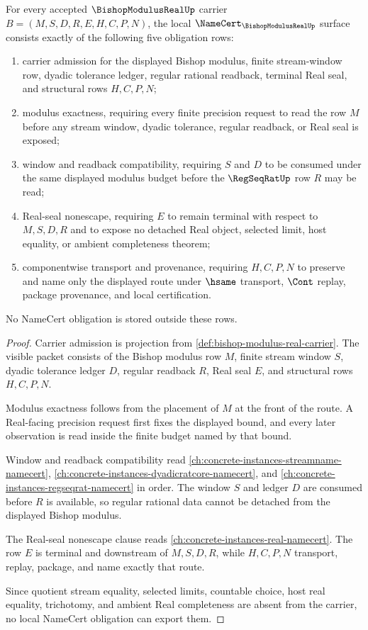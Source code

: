 \begin{theorem}
\label{thm:bishop-modulus-real-namecert-obligations}
For every accepted $\BishopModulusRealUp$ carrier $B=(M,S,D,R,E,H,C,P,N)$, the local $\NameCert_{\BishopModulusRealUp}$ surface consists exactly of the following five obligation rows:
\begin{enumerate}
\item carrier admission for the displayed Bishop modulus, finite stream-window row, dyadic tolerance ledger, regular rational readback, terminal Real seal, and structural rows $H,C,P,N$;
\item modulus exactness, requiring every finite precision request to read the row $M$ before any stream window, dyadic tolerance, regular readback, or Real seal is exposed;
\item window and readback compatibility, requiring $S$ and $D$ to be consumed under the same displayed modulus budget before the $\RegSeqRatUp$ row $R$ may be read;
\item Real-seal nonescape, requiring $E$ to remain terminal with respect to $M,S,D,R$ and to expose no detached Real object, selected limit, host equality, or ambient completeness theorem;
\item componentwise transport and provenance, requiring $H,C,P,N$ to preserve and name only the displayed route under $\hsame$ transport, $\Cont$ replay, package provenance, and local certification.
\end{enumerate}
No NameCert obligation is stored outside these rows.
\end{theorem}
\begin{proof}
Carrier admission is projection from \autoref{def:bishop-modulus-real-carrier}. The visible packet consists of the Bishop modulus row $M$, finite stream window $S$, dyadic tolerance ledger $D$, regular readback $R$, Real seal $E$, and structural rows $H,C,P,N$.

Modulus exactness follows from the placement of $M$ at the front of the route. A Real-facing precision request first fixes the displayed bound, and every later observation is read inside the finite budget named by that bound.

Window and readback compatibility read \autoref{ch:concrete-instances-streamname-namecert}, \autoref{ch:concrete-instances-dyadicratcore-namecert}, and \autoref{ch:concrete-instances-regseqrat-namecert} in order. The window $S$ and ledger $D$ are consumed before $R$ is available, so regular rational data cannot be detached from the displayed Bishop modulus.

The Real-seal nonescape clause reads \autoref{ch:concrete-instances-real-namecert}. The row $E$ is terminal and downstream of $M,S,D,R$, while $H,C,P,N$ transport, replay, package, and name exactly that route.

Since quotient stream equality, selected limits, countable choice, host real equality, trichotomy, and ambient Real completeness are absent from the carrier, no local NameCert obligation can export them.
\end{proof}

